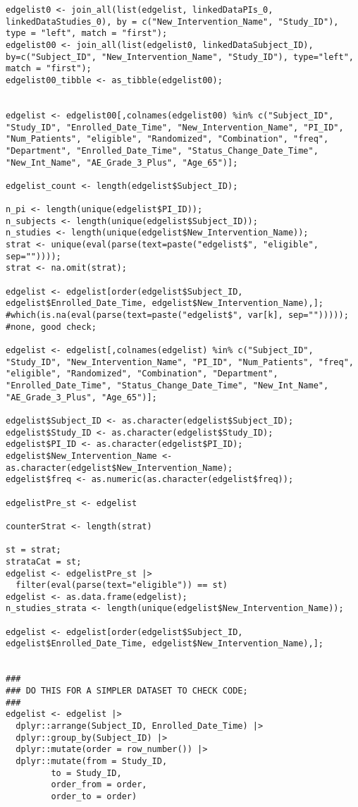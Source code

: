\begin{verbatim}
edgelist0 <- join_all(list(edgelist, linkedDataPIs_0, linkedDataStudies_0), by = c("New_Intervention_Name", "Study_ID"), type = "left", match = "first");
edgelist00 <- join_all(list(edgelist0, linkedDataSubject_ID), by=c("Subject_ID", "New_Intervention_Name", "Study_ID"), type="left", match = "first");
edgelist00_tibble <- as_tibble(edgelist00);


edgelist <- edgelist00[,colnames(edgelist00) %in% c("Subject_ID", "Study_ID", "Enrolled_Date_Time", "New_Intervention_Name", "PI_ID", "Num_Patients", "eligible", "Randomized", "Combination", "freq", "Department", "Enrolled_Date_Time", "Status_Change_Date_Time", "New_Int_Name", "AE_Grade_3_Plus", "Age_65")];

edgelist_count <- length(edgelist$Subject_ID);

n_pi <- length(unique(edgelist$PI_ID));
n_subjects <- length(unique(edgelist$Subject_ID));
n_studies <- length(unique(edgelist$New_Intervention_Name));
strat <- unique(eval(parse(text=paste("edgelist$", "eligible", sep=""))));
strat <- na.omit(strat);

edgelist <- edgelist[order(edgelist$Subject_ID, edgelist$Enrolled_Date_Time, edgelist$New_Intervention_Name),];
#which(is.na(eval(parse(text=paste("edgelist$", var[k], sep=""))))); #none, good check;

edgelist <- edgelist[,colnames(edgelist) %in% c("Subject_ID", "Study_ID", "New_Intervention_Name", "PI_ID", "Num_Patients", "freq", "eligible", "Randomized", "Combination", "Department", "Enrolled_Date_Time", "Status_Change_Date_Time", "New_Int_Name", "AE_Grade_3_Plus", "Age_65")];

edgelist$Subject_ID <- as.character(edgelist$Subject_ID);
edgelist$Study_ID <- as.character(edgelist$Study_ID);
edgelist$PI_ID <- as.character(edgelist$PI_ID);
edgelist$New_Intervention_Name <- as.character(edgelist$New_Intervention_Name);
edgelist$freq <- as.numeric(as.character(edgelist$freq));

edgelistPre_st <- edgelist

counterStrat <- length(strat)

st = strat;
strataCat = st;
edgelist <- edgelistPre_st |>
  filter(eval(parse(text="eligible")) == st)
edgelist <- as.data.frame(edgelist);
n_studies_strata <- length(unique(edgelist$New_Intervention_Name));

edgelist <- edgelist[order(edgelist$Subject_ID, edgelist$Enrolled_Date_Time, edgelist$New_Intervention_Name),];


###
### DO THIS FOR A SIMPLER DATASET TO CHECK CODE;
###
edgelist <- edgelist |>
  dplyr::arrange(Subject_ID, Enrolled_Date_Time) |>
  dplyr::group_by(Subject_ID) |>
  dplyr::mutate(order = row_number()) |>
  dplyr::mutate(from = Study_ID, 
         to = Study_ID,
         order_from = order, 
         order_to = order)


\end{verbatim}
